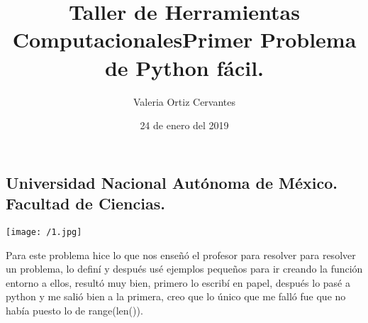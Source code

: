\documentclass{article} %
\title{\Huge Taller de Herramientas Computacionales}
\author{\huge Valeria Ortiz Cervantes}
\date{\LARGE 24 de enero del 2019}
\begin{document}
\maketitle
\begin{center}
	\subsection*{\LARGE Universidad Nacional Autónoma de México.\\Facultad de Ciencias.\\}
	\texttt{[image: /1.jpg]}
\end{center}
\newpage
\title{\LARGE Primer Problema de Python fácil.\\}
Para este problema hice lo que nos enseñó el profesor para resolver para resolver un problema, lo definí y después usé ejemplos pequeños para ir creando la función entorno a ellos, resultó muy bien, primero lo escribí en papel, después lo pasé a python y me salió bien a la primera, creo que lo único que me falló fue que no había puesto lo de range(len()).
\end{document}
